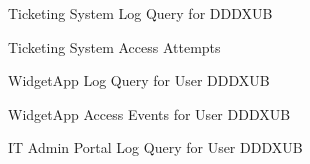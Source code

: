 \documentclass[11pt]{article}
\begin{document}
	\begin{figure}[h]
		\centering
		\caption{Ticketing System Log Query for DDDXUB}
		\label{fig: A24}
	\end{figure}
	
	\begin{figure}[h]
		\centering
		\caption{Ticketing System Access Attempts}
		\label{fig: A25}
	\end{figure}
	
	\begin{figure}[h]
		\centering
		\caption{WidgetApp Log Query for User DDDXUB}
		\label{fig: A26}
	\end{figure}
	
	\begin{figure}[h]
		\centering
		\caption{WidgetApp Access Events for User DDDXUB}
		\label{fig: A27}
	\end{figure}
	
	\begin{figure}[h]
		\centering
		\caption{IT Admin Portal Log Query for User DDDXUB}
		\label{fig: A28}
	\end{figure}
	
\end{document}
